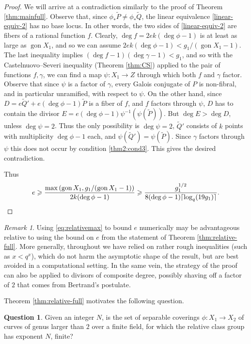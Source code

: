 \documentclass[11pt]{amsart}
\newcommand{\gon}{\operatorname{gon}}
\theoremstyle{definition}
\newtheorem{question}[theorem]{Question}
\theoremstyle{remark}
\newtheorem{remark}[theorem]{Remark}
\begin{document}
\begin{proof}
We will arrive at a contradiction similarly to the proof of Theorem \ref{thm:mainfull}. Observe that, since $\phi_*\tilde{P} \neq \phi_* \tilde{Q}$, the linear equivalence \eqref{linear-equiv-2} has no base locus. In other words, the two sides of \eqref{linear-equiv-2} are fibers of a rational function $f$. Clearly,  $\deg f = 2ek(\deg \phi-1)$ is at least as large as $\gon X_1$, and so we can assume $2ek(\deg \phi -1)  < g_1/(\gon X_1 -1)$. The last inequality implies  $(\deg f -1)(\deg \gamma -1) < g_1$, and so with the Castelnuovo--Severi inequality (Theorem \ref{thm:CS}) applied to the pair of functions $f, \gamma$, we can find a map $\psi: X_1 \to Z$ through which both $f$ and $\gamma$ factor. Observe that since $\psi$ is a factor of $\gamma$, every Galois conjugate of $P$ is non-fibral, and in particular unramified, with respect to $\psi$. On the other hand, since $D=e\tilde{Q}'+e(\deg \phi -1 )\tilde{P}$ is a fiber of $f$, and $f$ factors through $\psi$, $D$ has to contain the divisor $E=e(\deg \phi-1)\psi^{-1}(\psi(\tilde{P}))$. But $\deg E> \deg D$, unless $\deg \psi =2$. Thus the only possibility is $\deg \psi = 2$, $\tilde{Q}'$ consists of $k$ points with multiplicity $\deg \phi -1$ each, and $\psi(\tilde{Q}')=\psi(\tilde{P})$. Since $\gamma$ factors through $\psi$ this does not occur by condition \ref{thm2:cond3}. This gives the desired contradiction.

Thus \begin{equation}\label{eq:relativemax}e\geqslant \frac{\max \left(\gon X_1, g_1/(\gon X_1 - 1)\right)}{2k( \deg \phi-1)} \geqslant \frac{g_1^{1/2}}{8(\deg \phi -1 )\lceil \log_q(19g_1) \rceil}.\qedhere
\end{equation}
\end{proof}

\begin{remark}\label{rmk:relativefornumerics}
    Using \eqref{eq:relativemax} to bound $e$ numerically may be advantageous relative to using the bound on $e$ from the statement of Theorem \ref{thm:relative-full}. More generally, throughout we have relied on rather rough inequalities (such as $x<q^x$), which do not harm the asymptotic shape of the result, but are best avoided in a computational setting. In the same vein, the strategy of the proof can also be applied to divisors of composite degree, possibly shaving off a factor of $2$ that comes from Bertrand's postulate. 
\end{remark}

Theorem \ref{thm:relative-full} motivates the following question.
\begin{question}\label{mainquestion}
    Given an integer $N$, is the set of separable coverings $\phi: X_1 \to X_2$ of curves of genus larger than $2$ over a finite field, for which the relative class group has exponent $N$, finite?
\end{question}
\end{document}
